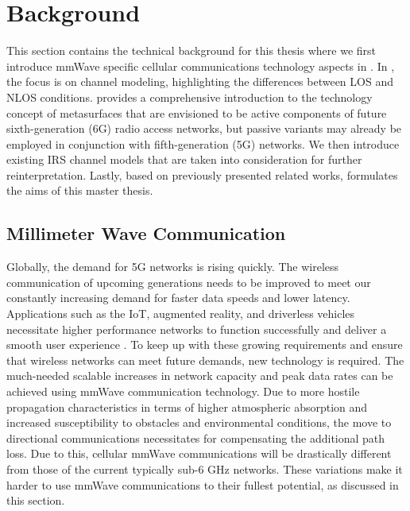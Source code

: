 \chapter{Background} \label{cha:Background}
This section contains the technical background for this thesis where we first introduce \ac{mmWave} specific cellular communications technology aspects in . In , the focus is on channel modeling, highlighting the differences between \ac{LOS} and \ac{NLOS} conditions.  provides a comprehensive introduction to the technology concept of metasurfaces that are envisioned to be active components of future sixth-generation (6G) radio access networks, but passive variants may already be employed in conjunction with fifth-generation (5G) networks. We then introduce existing \ac{IRS} channel models that are taken into consideration for further reinterpretation. Lastly, based on previously presented related works,  formulates the aims of this master thesis.
\section{Millimeter Wave Communication} \label{Millimeter wave communication}
Globally, the demand for 5G networks is rising quickly. The wireless communication of upcoming generations needs to be improved to meet our constantly increasing demand for faster data speeds and lower latency. Applications such as the \ac{IoT}, augmented reality, and driverless vehicles necessitate higher performance networks to function successfully and deliver a smooth user experience \cite{BANAFAA2023245, Towards6G}. To keep up with these growing requirements and ensure that wireless networks can meet future demands, new technology is required. The much-needed scalable increases in network capacity and peak data rates can be achieved using \ac{mmWave} communication technology. Due to more hostile propagation characteristics in terms of higher atmospheric absorption and increased susceptibility to obstacles and environmental conditions, the move to directional communications necessitates for compensating the additional path loss. Due to this, cellular mmWave communications will be drastically different from those of the current typically sub-6 GHz networks. These variations make it harder to use \ac{mmWave} communications to their fullest potential, as discussed in this section.

